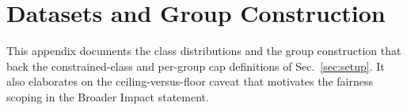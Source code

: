 \documentclass[10pt]{article}
\begin{document}
{\color{blue}}
{\color{blue}}
{\color{blue}}
% 

\section{Datasets and Group Construction}
\label{app:groups}

This appendix documents the class distributions and the group
construction that back the constrained-class and per-group cap
definitions of Sec.~\ref{sec:setup}. It also elaborates on the
ceiling-versus-floor caveat that motivates the fairness scoping in the
Broader Impact statement.

\end{document}
